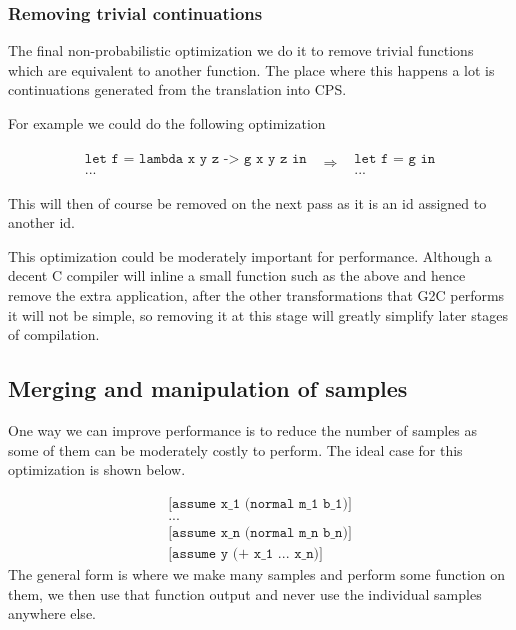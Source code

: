 \documentclass[a4paper]{article}
\newcommand{\optimization}[2]{
	\[
		\begin{array}{rcl}
			#1 & \Rightarrow & #2
		\end{array}
	\]
}
\begin{document}

\subsubsection{Removing trivial continuations}

The final non-probabilistic optimization we do it to remove trivial functions which are equivalent to another function. The place where this happens a lot is continuations generated from the translation into CPS.

For example we could do the following optimization

\optimization{
	\begin{array}{l}
		\texttt{let f = lambda x y z -> g x y z in} \\
		\texttt{...}
	\end{array}
}{
	\begin{array}{l}
		\texttt{let f = g in} \\
		\texttt{...}
	\end{array}
}
This will then of course be removed on the next pass as it is an id assigned to another id.

This optimization could be moderately important for performance. Although a decent C compiler will inline a small function such as the above and hence remove the extra application, after the other transformations that G2C performs it will not be simple, so removing it at this stage will greatly simplify later stages of compilation.




\subsection{Merging and manipulation of samples}

One way we can improve performance is to reduce the number of samples as some of them can be moderately costly to perform. The ideal case for this optimization is shown below.

\[
	\begin{array}{l}
		\texttt{[assume x\_1 (normal m\_1 b\_1)]} \\
		\texttt{...} \\
		\texttt{[assume x\_n (normal m\_n b\_n)]} \\
		\texttt{[assume y (+ x\_1 ...\ x\_n)]}
	\end{array}
\]
The general form is where we make many samples and perform some function on them, we then use that function output and never use the individual samples anywhere else.
\end{document}
